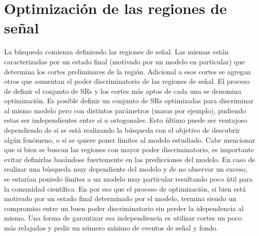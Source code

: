 \section{Optimización de las regiones de señal}

La búsqueda comienza definiendo las regiones de señal. Las mismas están caracterizadas por un estado final (motivado por un modelo en particular) que determina los cortes preliminares de la región. Adicional a esos cortes se agregan otros que aumentan el poder discriminatorio de las regiones de señal. El proceso de definir el conjunto de SRs y los cortes más aptos de cada una se denomina optimización. Es posible definir un conjunto de SRs optimizadas para discriminar al mismo modelo pero con distintos parámetros (masas por ejemplo), pudiendo estas ser independientes entre sí u ortogonales. Esto último puede ser ventajoso dependiendo de si se está realizando la búsqueda con el objetivo de descubrir algún fenómeno, o si se quiere poner límites al modelo estudiado. Cabe mencionar que si bien se buscan las regiones con mayor poder discriminatorio, es importante evitar definirlas basándose fuertemente en las predicciones del modelo. En caso de realizar una búsqueda muy dependiente del modelo y de no observar un exceso, se estarían poniedo límites a un modelo muy particular resultando poco útil para la comunidad científica. En por eso que el proceso de optimización, si bien está motivado por un estado final determinado por el modelo, termina siendo un compromiso entre un buen poder discriminatorio sin perder la idependencia al mismo. Una forma de garantizar esa independiencia es utilizar cortes un poco más relajados y pedir un número mínimo de eventos de señal y fondo.



